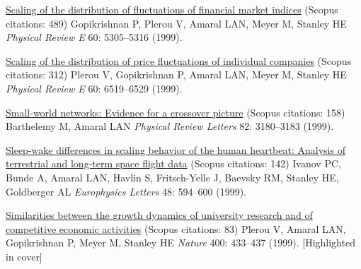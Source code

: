 \NumberedItem{\makebox[0.8cm][r]{[28]}}
\href{/people/amaral/scaling-of-the-distribution-of-fluctuations-of-financial-market-indices}
{Scaling of the distribution of fluctuations of financial market indices}
    (Scopus citations: 489)
\newline
Gopikrishnan P, Plerou V, Amaral LAN, Meyer M, Stanley HE
\newline
\textit{Physical Review E}
    60:
5305--5316 (1999).
\newline
\Gap
~
\Gap

\NumberedItem{\makebox[0.8cm][r]{[27]}}
\href{/people/amaral/scaling-of-the-distribution-of-price-fluctuations-of-individual-companies}
{Scaling of the distribution of price fluctuations of individual companies}
    (Scopus citations: 312)
\newline
Plerou V, Gopikrishnan P, Amaral LAN, Meyer M, Stanley HE
\newline
\textit{Physical Review E}
    60:
6519--6529 (1999).
\newline
\Gap
~
\Gap

\NumberedItem{\makebox[0.8cm][r]{[26]}}
\href{/people/amaral/small-world-networks-evidence-for-a-crossover-picture}
{Small-world networks: Evidence for a crossover picture}
    (Scopus citations: 158)
\newline
Barthelemy M, Amaral LAN
\newline
\textit{Physical Review Letters}
    82:
3180--3183 (1999).
\newline
\Gap
~
\Gap

\NumberedItem{\makebox[0.8cm][r]{[25]}}
\href{/people/amaral/sleep-wake-differences-in-scaling-behavior-of-the-human-heartbeat-analysis-of-terrestrial-and-long-term-space-flight-data}
{Sleep-wake differences in scaling behavior of the human heartbeat: Analysis of terrestrial and long-term space flight data}
    (Scopus citations: 142)
\newline
Ivanov PC, Bunde A, Amaral LAN, Havlin S, Fritsch-Yelle J, Baevsky RM, Stanley HE, Goldberger AL
\newline
\textit{Europhysics Letters}
    48:
594--600 (1999).
\newline
\Gap
~
\Gap

\NumberedItem{\makebox[0.8cm][r]{[24]}}
\href{/people/amaral/similarities-between-the-growth-dynamics-of-university-research-and-of-competitive-economic-activities}
{Similarities between the growth dynamics of university research and of competitive economic activities}
    (Scopus citations: 83)
\newline
Plerou V, Amaral LAN, Gopikrishnan P, Meyer M, Stanley HE
\newline
\textit{Nature}
    400:
433--437 (1999).
    [Highlighted in cover]
\newline
\Gap
~
\Gap

